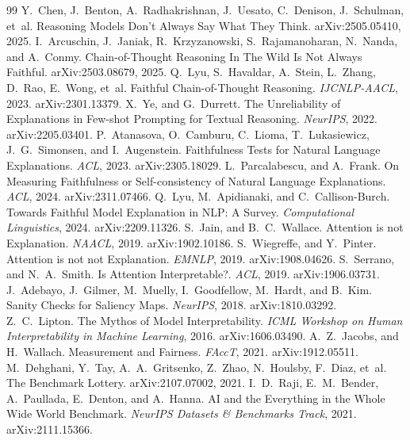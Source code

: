 \documentclass{article}
\begin{document}
\begin{thebibliography}{99}
 Y.~Chen, J.~Benton, A.~Radhakrishnan, J.~Uesato, C.~Denison, J.~Schulman, et~al. Reasoning Models Don't Always Say What They Think. arXiv:2505.05410, 2025.
 I.~Arcuschin, J.~Janiak, R.~Krzyzanowski, S.~Rajamanoharan, N.~Nanda, and A.~Conmy. Chain-of-Thought Reasoning In The Wild Is Not Always Faithful. arXiv:2503.08679, 2025.
 Q.~Lyu, S.~Havaldar, A.~Stein, L.~Zhang, D.~Rao, E.~Wong, et~al. Faithful Chain-of-Thought Reasoning. \emph{IJCNLP-AACL}, 2023. arXiv:2301.13379.
 X.~Ye, and G.~Durrett. The Unreliability of Explanations in Few-shot Prompting for Textual Reasoning. \emph{NeurIPS}, 2022. arXiv:2205.03401.
 P.~Atanasova, O.~Camburu, C.~Lioma, T.~Lukasiewicz, J.~G.~Simonsen, and I.~Augenstein. Faithfulness Tests for Natural Language Explanations. \emph{ACL}, 2023. arXiv:2305.18029.
 L.~Parcalabescu, and A.~Frank. On Measuring Faithfulness or Self-consistency of Natural Language Explanations. \emph{ACL}, 2024. arXiv:2311.07466.
 Q.~Lyu, M.~Apidianaki, and C.~Callison-Burch. Towards Faithful Model Explanation in NLP: A Survey. \emph{Computational Linguistics}, 2024. arXiv:2209.11326.
 S.~Jain, and B.~C.~Wallace. Attention is not Explanation. \emph{NAACL}, 2019. arXiv:1902.10186.
 S.~Wiegreffe, and Y.~Pinter. Attention is not not Explanation. \emph{EMNLP}, 2019. arXiv:1908.04626.
 S.~Serrano, and N.~A.~Smith. Is Attention Interpretable?. \emph{ACL}, 2019. arXiv:1906.03731.
 J.~Adebayo, J.~Gilmer, M.~Muelly, I.~Goodfellow, M.~Hardt, and B.~Kim. Sanity Checks for Saliency Maps. \emph{NeurIPS}, 2018. arXiv:1810.03292.
 Z.~C.~Lipton. The Mythos of Model Interpretability. \emph{ICML Workshop on Human Interpretability in Machine Learning}, 2016. arXiv:1606.03490.
 A.~Z.~Jacobs, and H.~Wallach. Measurement and Fairness. \emph{FAccT}, 2021. arXiv:1912.05511.
 M.~Dehghani, Y.~Tay, A.~A.~Gritsenko, Z.~Zhao, N.~Houlsby, F.~Diaz, et~al. The Benchmark Lottery. arXiv:2107.07002, 2021.
 I.~D.~Raji, E.~M.~Bender, A.~Paullada, E.~Denton, and A.~Hanna. AI and the Everything in the Whole Wide World Benchmark. \emph{NeurIPS Datasets \& Benchmarks Track}, 2021. arXiv:2111.15366.

\end{thebibliography}
\end{document}
